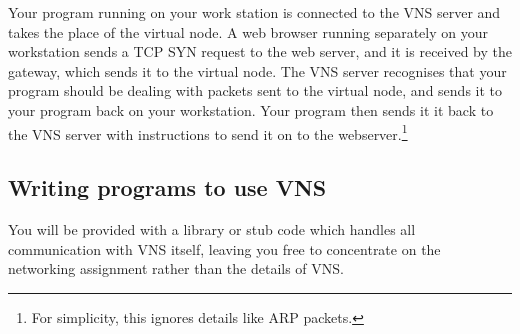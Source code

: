 \documentclass[a4paper,12pt]{article}
\begin{document}
Your program running on your work station is connected to the VNS server and takes the place of the virtual node.  A web browser running separately on your workstation sends a TCP SYN request to the web server, and it is received by the gateway, which sends it to the virtual node.  The VNS server recognises that your program should be dealing with packets sent to the virtual node, and sends it to your program back on your workstation.  Your program then sends it it back to the VNS server with instructions to send it on to the webserver.\footnote{For simplicity, this ignores details like ARP packets.}

\subsection*{Writing programs to use VNS}
You will be provided with a library or stub code which handles all communication with VNS itself, leaving you free to concentrate on the networking assignment rather than the details of VNS.
\end{document}
